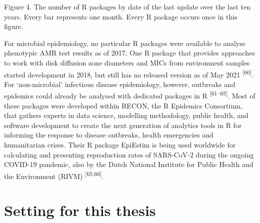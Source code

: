 \documentclass[
]{book}
\begin{document}
Figure 4. The number of R packages by date of the last update over the last ten years. Every bar represents one month. Every R package occurs once in this figure.

For microbial epidemiology, no particular R packages were available to analyse phenotypic AMR test results as of 2017. One R package that provides approaches to work with disk diffusion zone diameters and MICs from environment samples started development in 2018, but still has no released version as of May 2021 \textsuperscript{{[}60{]}}. For `non-microbial' infectious disease epidemiology, however, outbreaks and epidemics could already be analysed with dedicated packages in R \textsuperscript{{[}61--65{]}}. Most of these packages were developed within RECON, the R Epidemics Consortium, that gathers experts in data science, modelling methodology, public health, and software development to create the next generation of analytics tools in R for informing the response to disease outbreaks, health emergencies and humanitarian crises. Their R package EpiEstim is being used worldwide for calculating and presenting reproduction rates of SARS-CoV-2 during the ongoing COVID-19 pandemic, also by the Dutch National Institute for Public Health and the Environment (RIVM) \textsuperscript{{[}65,66{]}}.

\hypertarget{setting-for-this-thesis}{%
\section{Setting for this thesis}\label{setting-for-this-thesis}}
\end{document}
